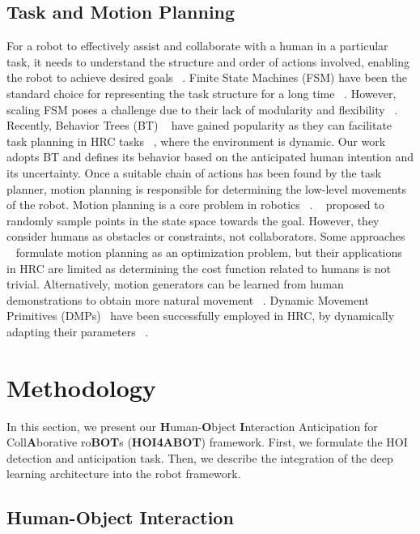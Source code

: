 \documentclass{article}
\begin{document}
\subsection{Task and Motion Planning}
For a robot to effectively assist and collaborate with a human in a particular task, it needs to understand the structure and order of actions involved, enabling the robot to achieve desired goals ~\citep{10.1145/3583136}. Finite State Machines (FSM) have been the standard choice for representing the task structure for a long time ~\citep{fsm1, fsm2}. However, scaling FSM poses a challenge due to their lack of modularity and flexibility ~\citep{BehaviorTrees}. Recently, Behavior Trees (BT) ~\citep{BehaviorTrees} have gained popularity as they can facilitate task planning in HRC tasks ~\citep{BT_robot1, BT_robot2}, where the environment is dynamic. Our work adopts BT and defines its behavior based on the anticipated human intention and its uncertainty. Once a suitable chain of actions has been found by the task planner, motion planning is responsible for determining the low-level movements of the robot. Motion planning is a core problem in robotics ~\citep{MP1_sampl, MP2_sampl, MP3_opt, MP4_opt, DMPs_survey}. ~\citep{MP1_sampl, MP2_sampl} proposed to randomly sample points in the state space towards the goal. However, they consider humans as obstacles or constraints, not collaborators. Some approaches ~\citep{MP3_opt, MP4_opt} formulate motion planning as an optimization problem, but their applications in HRC are limited as determining the cost function related to humans is not trivial. Alternatively, motion generators can be learned from human demonstrations to obtain more natural movement ~\citep{DMPs_survey, MP_learning1}. Dynamic Movement Primitives (DMPs)~\citep{DMPs_survey} have been successfully employed in HRC, by dynamically adapting their parameters ~\citep{MP_learning2, MP_learning3, MP_learning4}.

\section{Methodology} In this section, we present our \textbf{H}uman-\textbf{O}bject \textbf{I}nteraction Anticipation for Coll\textbf{A}borative ro\textbf{BOT}s (\textbf{HOI4ABOT}) framework. First, we formulate the HOI detection and anticipation task. Then, we describe the integration of the deep learning architecture into the robot framework.


\subsection{Human-Object Interaction}
\end{document}
